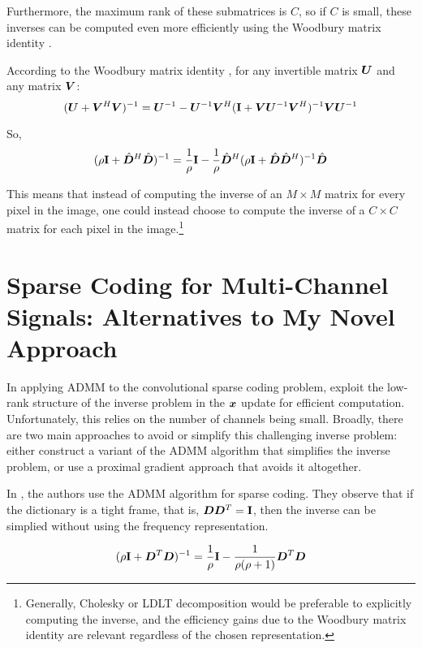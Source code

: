 Furthermore, the maximum rank of these submatrices is $C$, so if $C$ is small, these inverses can be computed even more efficiently using the Woodbury matrix identity \cite{vsorel2016fast} \cite{heide2015fast} \cite{wohlberg2015efficient}.

According to the Woodbury matrix identity \cite{henderson1981deriving}, for any invertible matrix $\bm{U}$ and any matrix $\bm{V}$:
\begin{equation}
(\bm{U} + \bm{V}^H\bm{V})^{-1} = \bm{U}^{-1} - \bm{U}^{-1}\bm{V}^H({\bf I} + \bm{V}\bm{U}^{-1}\bm{V}^H)^{-1}\bm{V}\bm{U}^{-1}
\end{equation}

So,
\begin{equation}
(\rho{\bf I} + \hat{\bm{D}}^H\hat{\bm{D}})^{-1} = \frac{1}{\rho}{\bf I} - \frac{1}{\rho}\hat{\bm{D}}^H(\rho{\bf I} + \hat{\bm{D}}\hat{\bm{D}}^H)^{-1}\hat{\bm{D}}
\end{equation}

This means that instead of computing the inverse of an $M \times M$ matrix for every pixel in the image, one could instead choose to compute the inverse of a $C \times C$ matrix for each pixel in the image.\footnote{Generally, Cholesky or LDLT decomposition would be preferable to explicitly computing the inverse, and the efficiency gains due to the Woodbury matrix identity are relevant regardless of the chosen representation.}

\section{Sparse Coding for Multi-Channel Signals: Alternatives to My Novel Approach}
In applying ADMM to the convolutional sparse coding problem, \cite{vsorel2016fast} \cite{heide2015fast} \cite{wohlberg2015efficient} exploit the low-rank structure of the inverse problem in the $\bm{x}$ update for efficient computation. Unfortunately, this relies on the number of channels being small. Broadly, there are two main approaches to avoid or simplify this challenging inverse problem: either construct a variant of the ADMM algorithm that simplifies the inverse problem, or use a proximal gradient approach that avoids it altogether.

In \cite{chodosh2018deep}\cite{murdock2018deep}, the authors use the ADMM algorithm for sparse coding. They observe that if the dictionary is a tight frame, that is, $\bm{D}\bm{D}^T = {\bf I}$, then the inverse can be simplied without using the frequency representation.

\begin{equation}
(\rho{\bf I} + \bm{D}^T\bm{D})^{-1} = \frac{1}{\rho}{\bf I} - \frac{1}{\rho(\rho + 1)}\bm{D}^T\bm{D}
\end{equation}

